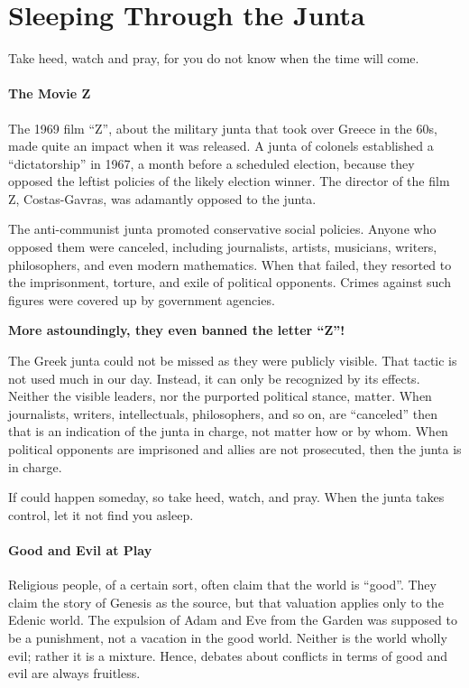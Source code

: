 \section{Sleeping Through the Junta}

\begin{quotex}
Take heed, watch and pray, for you do not know when the time will come.
\end{quotex}


\paragraph{The Movie Z}


The 1969 film ``Z'', about the military junta that took over Greece in the 60s, made quite an impact when it was released. A junta of colonels established a ``dictatorship'' in 1967, a month before a scheduled election, because they opposed the leftist policies of the likely election winner. The director of the film Z, Costas-Gavras, was adamantly opposed to the junta.

The anti-communist junta promoted conservative social policies. Anyone who opposed them were canceled, including journalists, artists, musicians, writers, philosophers, and even modern mathematics. When that failed, they resorted to the imprisonment, torture, and exile of political opponents. Crimes against such figures were covered up by government agencies.

\textbf{More astoundingly, they even banned the letter ``Z''!}


The Greek junta could not be missed as they were publicly visible. That tactic is not used much in our day. Instead, it can only be recognized by its effects. Neither the visible leaders, nor the purported political stance, matter. When journalists, writers, intellectuals, philosophers, and so on, are ``canceled'' then that is an indication of the junta in charge, not matter how or by whom. When political opponents are imprisoned and allies are not prosecuted, then the junta is in charge.

If could happen someday, so take heed, watch, and pray. When the junta takes control, let it not find you asleep.

\paragraph{Good and Evil at Play}


Religious people, of a certain sort, often claim that the world is ``good''. They claim the story of Genesis as the source, but that valuation applies only to the Edenic world. The expulsion of Adam and Eve from the Garden was supposed to be a punishment, not a vacation in the good world. Neither is the world wholly evil; rather it is a mixture. Hence, debates about conflicts in terms of good and evil are always fruitless.

